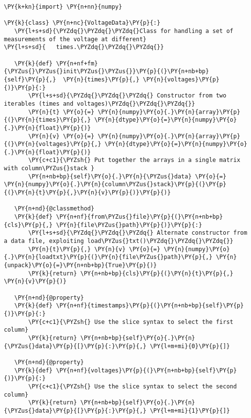\begin{Verbatim}[label=\makebox{\url{https://github.com/lucabaldini/cmepda/tree/master/slides/latex/snippets/voltage\_data\_1.py}},commandchars=\\\{\}]
\PY{k+kn}{import} \PY{n+nn}{numpy}

\PY{k}{class} \PY{n+nc}{VoltageData}\PY{p}{:}
   \PY{l+s+sd}{\PYZdq{}\PYZdq{}\PYZdq{}Class for handling a set of measurements of the voltage at different}
\PY{l+s+sd}{   times.\PYZdq{}\PYZdq{}\PYZdq{}}
   
   \PY{k}{def} \PY{n+nf+fm}{\PYZus{}\PYZus{}init\PYZus{}\PYZus{}}\PY{p}{(}\PY{n+nb+bp}{self}\PY{p}{,}  \PY{n}{times}\PY{p}{,} \PY{n}{voltages}\PY{p}{)}\PY{p}{:}
       \PY{l+s+sd}{\PYZdq{}\PYZdq{}\PYZdq{} Constructor from two iterables (times and voltages)\PYZdq{}\PYZdq{}\PYZdq{}}
       \PY{n}{t} \PY{o}{=} \PY{n}{numpy}\PY{o}{.}\PY{n}{array}\PY{p}{(}\PY{n}{times}\PY{p}{,} \PY{n}{dtype}\PY{o}{=}\PY{n}{numpy}\PY{o}{.}\PY{n}{float}\PY{p}{)}
       \PY{n}{v} \PY{o}{=} \PY{n}{numpy}\PY{o}{.}\PY{n}{array}\PY{p}{(}\PY{n}{voltages}\PY{p}{,} \PY{n}{dtype}\PY{o}{=}\PY{n}{numpy}\PY{o}{.}\PY{n}{float}\PY{p}{)}
       \PY{c+c1}{\PYZsh{} Put together the arrays in a single matrix with column\PYZus{}stack }
       \PY{n+nb+bp}{self}\PY{o}{.}\PY{n}{\PYZus{}data} \PY{o}{=} \PY{n}{numpy}\PY{o}{.}\PY{n}{column\PYZus{}stack}\PY{p}{(}\PY{p}{(}\PY{n}{t}\PY{p}{,}\PY{n}{v}\PY{p}{)}\PY{p}{)}
   
   \PY{n+nd}{@classmethod}
   \PY{k}{def} \PY{n+nf}{from\PYZus{}file}\PY{p}{(}\PY{n+nb+bp}{cls}\PY{p}{,} \PY{n}{file\PYZus{}path}\PY{p}{)}\PY{p}{:}
       \PY{l+s+sd}{\PYZdq{}\PYZdq{}\PYZdq{} Alternate constructor from a data file, exploiting load\PYZus{}txt()\PYZdq{}\PYZdq{}\PYZdq{}}
       \PY{n}{t}\PY{p}{,} \PY{n}{v} \PY{o}{=} \PY{n}{numpy}\PY{o}{.}\PY{n}{loadtxt}\PY{p}{(}\PY{n}{file\PYZus{}path}\PY{p}{,} \PY{n}{unpack}\PY{o}{=}\PY{n+nb+bp}{True}\PY{p}{)}
       \PY{k}{return} \PY{n+nb+bp}{cls}\PY{p}{(}\PY{n}{t}\PY{p}{,} \PY{n}{v}\PY{p}{)}   
   
   \PY{n+nd}{@property}
   \PY{k}{def} \PY{n+nf}{timestamps}\PY{p}{(}\PY{n+nb+bp}{self}\PY{p}{)}\PY{p}{:}
       \PY{c+c1}{\PYZsh{} Use the slice syntax to select the first column}
       \PY{k}{return} \PY{n+nb+bp}{self}\PY{o}{.}\PY{n}{\PYZus{}data}\PY{p}{[}\PY{p}{:}\PY{p}{,} \PY{l+m+mi}{0}\PY{p}{]}
   
   \PY{n+nd}{@property}
   \PY{k}{def} \PY{n+nf}{voltages}\PY{p}{(}\PY{n+nb+bp}{self}\PY{p}{)}\PY{p}{:}
       \PY{c+c1}{\PYZsh{} Use the slice syntax to select the second column}
       \PY{k}{return} \PY{n+nb+bp}{self}\PY{o}{.}\PY{n}{\PYZus{}data}\PY{p}{[}\PY{p}{:}\PY{p}{,} \PY{l+m+mi}{1}\PY{p}{]}
\end{Verbatim}